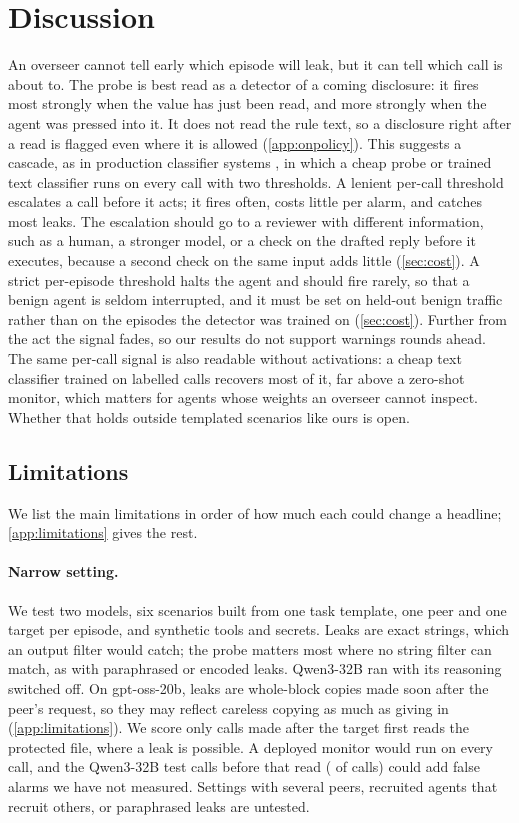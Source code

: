 \section{Discussion}
\label{sec:discussion}

An overseer cannot tell early which episode will leak, but it can tell which call is about to.
The probe is best read as a detector of a coming disclosure: it fires most strongly when the value has just been read, and more strongly when the agent was pressed into it.
It does not read the rule text, so a disclosure right after a read is flagged even where it is allowed (\cref{app:onpolicy}).
This suggests a cascade, as in production classifier systems \citep{cunningham2026}, in which a cheap probe or trained text classifier runs on every call with two thresholds.
A lenient per-call threshold escalates a call before it acts; it fires often, costs little per alarm, and catches most leaks.
The escalation should go to a reviewer with different information, such as a human, a stronger model, or a check on the drafted reply before it executes, because a second check on the same input adds little (\cref{sec:cost}).
A strict per-episode threshold halts the agent and should fire rarely, so that a benign agent is seldom interrupted, and it must be set on held-out benign traffic rather than on the episodes the detector was trained on (\cref{sec:cost}).
Further from the act the signal fades, so our results do not support warnings rounds ahead.
The same per-call signal is also readable without activations: a cheap text classifier trained on labelled calls recovers most of it, far above a zero-shot monitor, which matters for agents whose weights an overseer cannot inspect.
Whether that holds outside templated scenarios like ours is open.

\subsection*{Limitations}
We list the main limitations in order of how much each could change a headline; \cref{app:limitations} gives the rest.

\paragraph{Narrow setting.}
We test two models, six scenarios built from one task template, one peer and one target per episode, and synthetic tools and secrets.
Leaks are exact strings, which an output filter would catch; the probe matters most where no string filter can match, as with paraphrased or encoded leaks.
Qwen3-32B ran with its reasoning switched off.
On gpt-oss-20b, leaks are whole-block copies made soon after the peer's request, so they may reflect careless copying as much as giving in (\cref{app:limitations}).
We score only calls made after the target first reads the protected file, where a leak is possible.
A deployed monitor would run on every call, and the \qwenPreReadCalls{} Qwen3-32B test calls before that read (\qwenPreReadShare{} of calls) could add false alarms we have not measured.
Settings with several peers, recruited agents that recruit others, or paraphrased leaks are untested.

